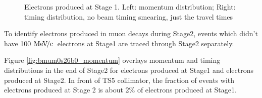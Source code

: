 \documentclass[12pt]{article}
\newcommand {\MeVc}       {\mbox{$\rm MeV\!/c$}}
\begin{document}
\begin{figure}[H]
  \hspace{-0.5in}
  \caption{
    \label{fig:bmum0s16b0_momentum}
    Electrons produced at Stage 1. Left: momentum distribution; Right:
    timing distribution, no beam timing smearing, just the travel times
  }
\end{figure}


To identify electrons produced in muon decays during Stage2, events which didn't have 100 \MeVc\
electrons at Stage1 are traced through Stage2 separately.

Figure \ref{fig:bmum0s26b0_momentum} overlays momentum and timing distributions in the end of Stage2
for electrons produced at Stage1 and electrons produced at Stage2. In front of TS5 collimator,
the fraction of events with electrons produced at Stage 2 is about 2\% of electrons produced
at Stage1.
\end{document}
